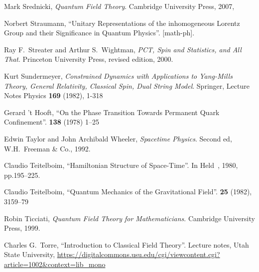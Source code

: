 \begin{thebibliography}{99}
Mark Srednicki,
\textit{Quantum Field Theory}.
Cambridge University Press, 2007,
{\tt{}}

Norbert Straumann,
``Unitary Representations of the inhomogeneous Lorentz Group and their Significance in Quantum Physics''.
 [math-ph].

Ray F.~Streater and Arthur S.~Wightman,
\textit{PCT, Spin and Statistics, and All That}.
Princeton University Press, revised edition, 2000.

Kurt Sundermeyer,
\textit{Constrained Dynamics with Applications to Yang-Mills Theory, General Relativity, Classical Spin, Dual String Model}.
Springer, Lecture Notes Physics \textbf{169} (1982), 1-318



Gerard 't Hooft,
``On the Phase Transition Towards Permanent Quark Confinement''.
 \textbf{138} (1978) 1--25
{\tt{}}

Edwin Taylor and John Archibald Wheeler,
\textit{Spacetime Physics}.
Second ed, W.H.~Freeman \& Co., 1992.

Claudio Teitelboim,
``Hamiltonian Structure of Space-Time''.
In Held~\cite{Held:1980gb}, 1980, pp.195--225.

Claudio Teitelboim,
``Quantum Mechanics of the Gravitational Field''.
 \textbf{25} (1982), 3159--79
{\tt{}}

Robin Ticciati,
\textit{Quantum Field Theory for Mathematicians}.
Cambridge University Press, 1999.

Charles G.~Torre,
``Introduction to Classical Field Theory''.
Lecture notes, Utah State University,
\url{https://digitalcommons.usu.edu/cgi/viewcontent.cgi?article=1002&context=lib_mono}






\end{thebibliography}
